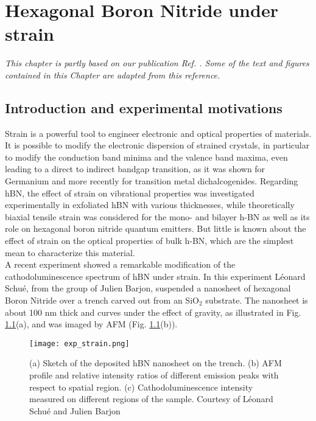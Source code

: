 \chapter{Hexagonal Boron Nitride under strain}
\textit{This chapter is partly based on our publication Ref. \cite{lechifflart2022excitons}. Some of the text and figures contained in this Chapter are adapted from this reference.}

\chaptertoc{}

%
\section{Introduction and experimental motivations}
Strain is a powerful tool to engineer electronic and optical properties of materials. It is possible to modify the electronic dispersion of strained crystals, in particular to modify the conduction band minima and the valence band maxima, even leading to a direct to indirect bandgap transition, as it was shown for Germanium \cite{hoshina2009first,cheng2010strain} and more recently for transition metal dichalcogenides.\cite{desai2014strain,choudhary2020shear,frisenda2017biaxial} Regarding hBN, the effect of strain on vibrational properties was investigated experimentally in exfoliated hBN with various thicknesses,\cite{androulidakis2018strained} while theoretically biaxial tensile strain was considered for the mono- and bilayer h-BN \cite{yang2013distorted,fujimoto2016band} as well as its role on hexagonal boron nitride quantum emitters.\cite{tabesh2021strain} But little is known about the effect of strain on the optical properties of bulk h-BN, which are the simplest mean to characterize this material. \\
A recent experiment showed a remarkable modification of the cathodoluminescence spectrum of hBN under strain. \cite{schue2017proprietes} In this experiment Léonard Schué, from the group of Julien Barjon, suspended a nanosheet of hexagonal Boron Nitride over a trench carved out from an SiO$_2$ substrate. The nanosheet is about 100 nm thick and curves under the effect of gravity, as illustrated in Fig. \ref{fig:exp_strain}(a), and was imaged by \acrfull{AFM} (Fig. \ref{fig:exp_strain}(b)).
\begin{figure}[tbp]
	\vspace{0.2cm}
	\setcapindent{2em}
	\centering
	\texttt{[image: exp\_strain.png]}
	\caption{(a) Sketch of the deposited hBN nanosheet on the trench. (b) AFM profile and relative intensity ratios of different emission peaks with respect to spatial region. (c) Cathodoluminescence intensity measured on different regions of the sample. Courtesy of Léonard Schué and Julien Barjon}
	\label{fig:exp_strain}
\end{figure}
